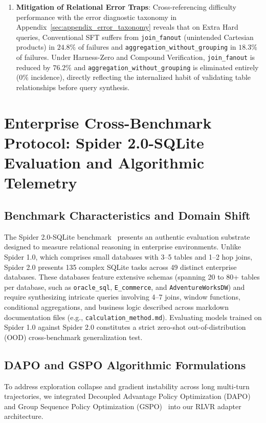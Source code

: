 \documentclass{article}
\theoremstyle{plain}
\theoremstyle{definition}
\theoremstyle{remark}
\begin{document}
\begin{enumerate}[leftmargin=*,itemsep=3pt]
    \item \textbf{Mitigation of Relational Error Traps}:  
    Cross-referencing difficulty performance with the error diagnostic taxonomy in Appendix~\ref{sec:appendix_error_taxonomy} reveals that on Extra Hard queries, Conventional SFT suffers from \texttt{join\_fanout} (unintended Cartesian products) in $24.8\%$ of failures and \texttt{aggregation\_without\_grouping} in $18.3\%$ of failures. Under Harness-Zero and Compound Verification, \texttt{join\_fanout} is reduced by $76.2\%$ and \texttt{aggregation\_without\_grouping} is eliminated entirely ($0\%$ incidence), directly reflecting the internalized habit of validating table relationships before query synthesis.
\end{enumerate}

\section{Enterprise Cross-Benchmark Protocol: Spider 2.0-SQLite Evaluation and Algorithmic Telemetry}
\label{sec:appendix_spider2}

\subsection{Benchmark Characteristics and Domain Shift}
The Spider 2.0-SQLite benchmark~\citep{yang2026harnesssql} presents an authentic evaluation substrate designed to measure relational reasoning in enterprise environments. Unlike Spider 1.0, which comprises small databases with 3--5 tables and 1--2 hop joins, Spider 2.0 presents 135 complex SQLite tasks across 49 distinct enterprise databases. These databases feature extensive schemas (spanning 20 to 80+ tables per database, such as \texttt{oracle\_sql}, \texttt{E\_commerce}, and \texttt{AdventureWorksDW}) and require synthesizing intricate queries involving 4--7 joins, window functions, conditional aggregations, and business logic described across markdown documentation files (e.g., \texttt{calculation\_method.md}). Evaluating models trained on Spider 1.0 against Spider 2.0 constitutes a strict zero-shot out-of-distribution (OOD) cross-benchmark generalization test.

\subsection{DAPO and GSPO Algorithmic Formulations}
To address exploration collapse and gradient instability across long multi-turn trajectories, we integrated Decoupled Advantage Policy Optimization (DAPO)~\citep{yu2025dapo} and Group Sequence Policy Optimization (GSPO)~\citep{zheng2025group} into our RLVR adapter architecture.
\end{document}
